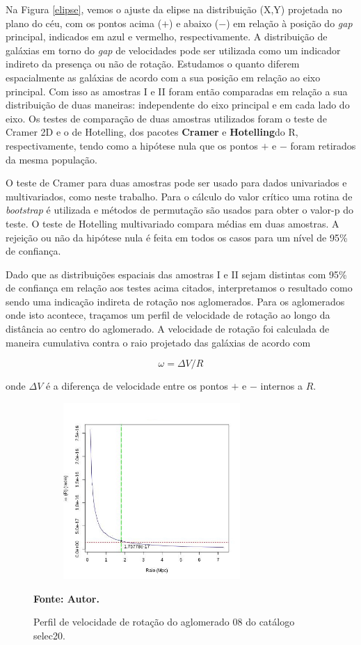 Na Figura \ref{elipse}, vemos o ajuste da elipse na distribuição (X,Y) projetada no plano do céu, com os pontos acima ($+$) e abaixo ($-$) em relação à posição do \textit{gap} principal, indicados em azul e vermelho, respectivamente. A distribuição de galáxias em torno do \textit{gap} de velocidades pode ser utilizada como um indicador indireto da presença ou não de rotação. Estudamos o quanto diferem espacialmente as galáxias de acordo com a sua posição em relação ao eixo principal. Com isso as amostras I e II foram então comparadas em relação a sua distribuição de duas maneiras: independente do eixo principal e em cada lado do eixo. Os testes de comparação de duas amostras utilizados foram o teste de Cramer 2D e o de Hotelling, dos pacotes \textbf{ Cramer} e \textbf{ Hotelling}do R, respectivamente, tendo como a hipótese nula que os pontos $+$ e $-$ foram retirados da mesma população. 

O teste de Cramer para duas amostras pode ser usado para dados univariados e multivariados, como neste trabalho. Para o cálculo do valor crítico uma rotina de \textit{bootstrap} é utilizada e métodos de permutação são usados para obter o valor-p do teste. O teste de Hotelling multivariado compara médias em duas amostras. A rejeição ou não da hipótese nula é feita em todos os casos para um nível de 95\% de confiança. 

Dado que as distribuições espaciais das amostras  I e II sejam distintas com 95\% de confiança em relação aos testes acima citados, interpretamos o resultado como sendo uma indicação indireta de rotação nos aglomerados. Para os aglomerados onde isto acontece, traçamos um perfil de velocidade de rotação ao longo da distância ao centro do aglomerado. A velocidade de rotação foi calculada de maneira cumulativa contra o raio projetado das galáxias de acordo com

\begin{equation}
\omega= \Delta V/R
\label{eq:eq10}
\end{equation}

\noindent onde $\Delta V$ é a diferença de velocidade entre os pontos $+$ e $-$ internos a $R$.

\begin{figure}[H] %
\vspace{-2pt}
\begin{center}
\includegraphics[height=6.7cm,width=9cm]{04-figuras/rotacao}%
\caption{Perfil de velocidade de rotação do aglomerado 08 do catálogo selec20.}
\textbf{Fonte: Autor.}
\label{rotacao}%
\end{center}
\end{figure}

